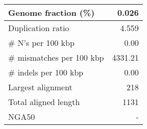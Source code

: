 \documentclass[12pt,a4paper]{article}
\begin{document}
\begin{table}[ht]
\begin{center}
\begin{tabular}{|l*{1}{|r}|}
Genome fraction (\%) & 0.026 \\ \hline
Duplication ratio & 4.559 \\ \hline
\# N's per 100 kbp & 0.00 \\ \hline
\# mismatches per 100 kbp & 4331.21 \\ \hline
\# indels per 100 kbp & 0.00 \\ \hline
Largest alignment & 218 \\ \hline
Total aligned length & 1131 \\ \hline
NGA50 & - \\ \hline
\end{tabular}
\end{center}
\end{table}
\end{document}
